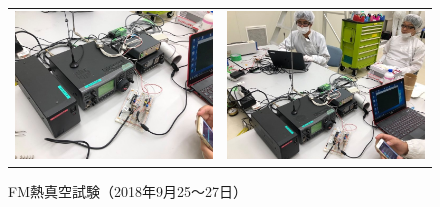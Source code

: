 \begin{figure}[H]
\begin{tabular}{cc}
\begin{minipage}{0.5\hsize}
			\begin{center}
				\includegraphics[width=1\textwidth]{04/fig/4-8-4-3.jpg}
			\end{center}
		\end{minipage}&
		\begin{minipage}{0.5\hsize}
			\begin{center}
				\includegraphics[width=1\textwidth]{04/fig/4-8-4-4.jpg}
			\end{center}
		\end{minipage}
	\end{tabular}
	\caption{FM熱真空試験（2018年9月25～27日）}
	\label{fig4-8-4-1}
\end{figure}

